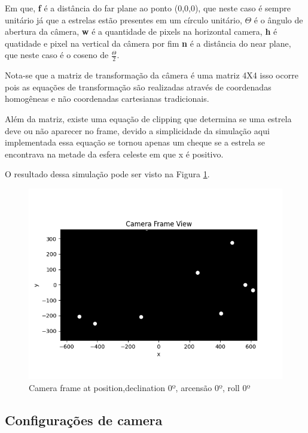 Em que, \textbf{f} é a distância do far plane ao ponto (0,0,0), que neste caso é sempre unitário já que a estrelas estão presentes em um círculo unitário, $\Theta$ é o ângulo de abertura  da câmera, \textbf{w} é a quantidade de pixels na horizontal camera, \textbf{h} é quatidade e pixel na vertical da câmera por fim \textbf{n} é a distância do near plane, que neste caso é o coseno de $\frac{\Theta}{2}$.

Nota-se que a matriz de transformação da câmera é uma matriz 4X4 isso ocorre pois as equações de transformação são realizadas através de coordenadas homogêneas e não coordenadas cartesianas tradicionais.

Além da matriz, existe uma equação de clipping que determina se uma estrela deve ou não aparecer no frame, devido a simplicidade da simulação aqui implementada essa equação se tornou apenas um cheque se a estrela se encontrava na metade da esfera celeste em que x é positivo.

O resultado dessa simulação pode ser visto na Figura \ref{fig:resultado_simulacao}.

\begin{figure}[H]
    \centering
    \includegraphics[width=\textwidth]{images/resultado_simulacao.png}
    \caption{Camera frame at position,declination 0º, arcensão 0º, roll 0º}
    \label{fig:resultado_simulacao}
\end{figure}

\subsection{Configurações de camera}

